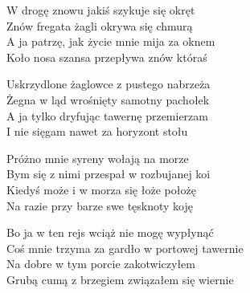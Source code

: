 \begin{text}
W drogę znowu jakiś szykuje się okręt\\
Znów fregata żagli okrywa się chmurą\\
A ja patrzę, jak życie mnie mija za oknem\\
Koło nosa szansa przepływa znów któraś

Uskrzydlone żaglowce z pustego nabrzeża\\
Żegna w ląd wrośnięty samotny pachołek\\
A ja tylko dryfując tawernę przemierzam\\
I nie sięgam nawet za horyzont stołu

Próżno mnie syreny wołają na morze\\
Bym się z nimi przespał w rozbujanej koi\\
Kiedyś może i w morza się łoże położę\\
Na razie przy barze swe tęsknoty koję

Bo ja w ten rejs wciąż nie mogę wypłynąć\\
Coś mnie trzyma za gardło w portowej tawernie\\
Na dobre w tym porcie zakotwiczyłem\\
Grubą cumą z brzegiem związałem się wiernie
\end{text}